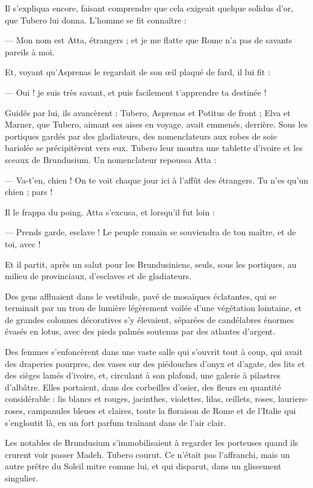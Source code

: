\documentclass[a4paper, 11pt, oneside, polutonikogreek, french]{article}
\begin{document}
Il s'expliqua encore, faisant comprendre que cela exigeait quelque solidus d'or, que Tubero lui donna. L'homme se fit connaître :

--- Mon nom est Atta, étrangers ; et je me flatte que Rome n'a pas de savants pareils à moi.

Et, voyant qu'Asprenas le regardait de son œil plaqué de fard, il lui fit :

--- Oui ! je suis très savant, et puis facilement t'apprendre ta destinée !

Guidés par lui, ils avancèrent : Tubero, Asprenas et Potitus de front ; Elva et Marner, que Tubero, aimant ses aises en voyage, avait emmenés, derrière. Sous les portiques gardés par des gladiateurs, des nomenclateurs aux robes de soie bariolée se précipitèrent vers eux. Tubero leur montra une tablette d'ivoire et les sceaux de Brundusium. Un nomenclateur repoussa Atta :

--- Va-t'en, chien ! On te voit chaque jour ici à l'affût des étrangers. Tu n'es qu'un chien ; pars !

Il le frappa du poing. Atta s'excusa, et lorsqu'il fut loin :

--- Prends garde, esclave ! Le peuple romain se souviendra de ton maître, et de toi, avec !

Et il partit, après un salut pour les Brundusiniens, seuls, sous les portiques, au milieu de provinciaux, d'esclaves et de gladiateurs.

Des gens affluaient dans le vestibule, pavé de mosaïques éclatantes, qui se terminait par un trou de lumière légèrement voilée d'une végétation lointaine, et de grandes colonnes décoratives s'y élevaient, séparées de candélabres énormes évasés en lotus, avec des pieds palmés soutenus par des atlantes d'argent.

Des femmes s'enfoncèrent dans une vaste salle qui s'ouvrit tout à coup, qui avait des draperies pourpres, des vases sur des piédouches d'onyx et d'agate, des lits et des sièges lamés d'ivoire, et, circulant à son plafond, une galerie à pilastres d'albâtre. Elles portaient, dans des corbeilles d'osier, des fleurs en quantité considérable : lis blancs et rouges, jacinthes, violettes, lilas, œillets, roses, lauriers-roses, campanules bleues et claires, toute la floraison de Rome et de l'Italie qui s'engloutit là, en un fort parfum traînant dans de l'air clair.

Les notables de Brundusium s'immobilisaient à regarder les porteuses quand ils crurent voir passer Madeh. Tubero courut. Ce n'était pas l'affranchi, mais un autre prêtre du Soleil mitre comme lui, et qui disparut, dans un glissement singulier.
\end{document}
